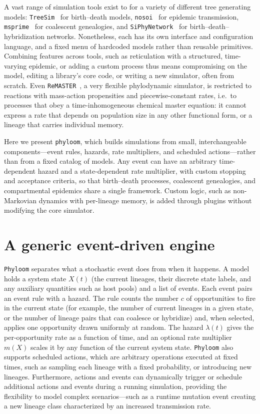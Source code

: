 \documentclass[11pt]{article}
\begin{document}
A vast range of simulation tools exist to for a variety of different
tree generating models:
\texttt{TreeSim}~\citep{stadler2011treesim} for birth--death models,
\texttt{nosoi}~\citep{lequime2020nosoi} for epidemic transmission,
\texttt{msprime}~\citep{baumdicker2022msprime} for coalescent genealogies, and
\texttt{SiPhyNetwork}~\citep{justison2023siphynetwork} for
birth--death--hybridization networks. Nonetheless, each has its own interface and
configuration language, and a fixed menu of hardcoded models rather than
reusable primitives. Combining features across tools, such as reticulation with
a structured, time-varying epidemic, or adding a custom process thus means
compromising on the model, editing a library's core code, or writing a new
simulator, often from scratch. Even \texttt{ReMASTER}~\citep{vaughan2024remaster},
a very flexible phylodynamic simulator, is restricted to reactions with
mass-action propensities and piecewise-constant rates, i.e.\ to processes that
obey a time-inhomogeneous chemical master equation: it cannot express a rate
that depends on population size in any other functional form, or a lineage that
carries individual memory.

Here we present \texttt{phyloom}, which builds simulations from small,
interchangeable components---event rules, hazards, rate multipliers, and
scheduled actions---rather than from a fixed catalog of models. Any event can
have an arbitrary time-dependent hazard and a state-dependent rate multiplier,
with custom stopping and acceptance criteria, so that birth--death processes,
coalescent genealogies, and compartmental epidemics share a single framework.
Custom logic, such as non-Markovian dynamics with per-lineage memory, is added
through plugins without modifying the core simulator.

\section{A generic event-driven engine}
\label{sec:engine}

\texttt{Phyloom} separates what a stochastic event does from when it
happens. A model holds a system state $X(t)$ (the current lineages, their
discrete state labels, and any auxiliary quantities such as host pools) and a
list of events. Each event pairs an event rule with a hazard. The
rule counts the number $c$ of opportunities to fire in the current state (for
example, the number of current lineages in a given state, or the number of
lineage pairs that can coalesce or hybridize) and, when selected, applies one
opportunity drawn uniformly at random. The hazard $\lambda(t)$ gives the
per-opportunity rate as a function of time, and an optional
rate multiplier $m(X)$ scales it by any function of the current system
state. \texttt{Phyloom} also supports scheduled actions, which are arbitrary
operations executed at fixed times, such as sampling each lineage with
a fixed probability, or introducing new lineages. Furthermore, actions
and events can dynamically trigger or schedule additional actions and
events during a running simulation, providing the flexibility to model
complex scenarios---such as a runtime mutation event creating a new
lineage class characterized by an increased transmission rate.
\end{document}

